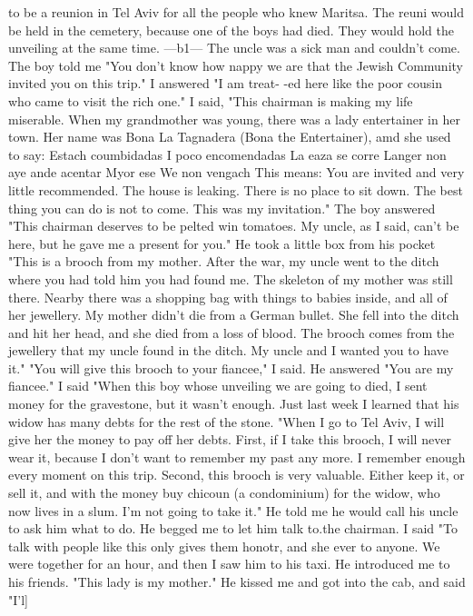 to be a reunion in Tel Aviv for all the people who knew Maritsa.
The reuni 
would be held in the cemetery, because one of the boys had died.
They would 
hold the unveiling at the same time.
—b1— 
The uncle was a sick man and couldn't come.
The boy told me "You don't know how 
nappy we are that the Jewish Community invited you on this trip."
I answered "I am treat-
-ed here like the poor cousin who came to visit the rich one."
I said, "This chairman is 
making my life miserable.
When my grandmother was young, there was a lady entertainer in 
her town.
Her name was Bona La Tagnadera (Bona the Entertainer), amd she used to say: 
Estach coumbidadas 
I poco encomendadas 
La eaza se corre 
Langer non aye ande acentar 
Myor ese We non vengach 
This means: You are invited and very little recommended.
The house is leaking.
There 
is no place to sit down.
The best thing you can do is not to come.
This was my invitation."
The boy answered "This chairman deserves to be pelted win tomatoes.
My uncle, as I 
said, can't be here, but he gave me a present for you."
He took a little box from his pocket 
"This is a brooch from my mother.
After the war, my uncle went to the ditch where you had 
told him you had found me.
The skeleton of my mother was still there.
Nearby there was 
a shopping bag with things to babies inside, and all of her jewellery.
My mother 
didn't die from a German bullet.
She fell into the ditch and hit her head, and she died from a loss of blood.
The brooch comes from the jewellery that my uncle found in the ditch.
My uncle and I wanted you to have it."
"You will give this brooch to your fiancee," I said.
He answered "You are my fiancee."
I said "When this boy whose unveiling we are going to died, I sent money for the gravestone, but it wasn't enough.
Just last week I learned that his widow has many debts for the rest of the stone.
"When I go to Tel Aviv, I will give her the money to pay off her debts.
First, if I take this brooch, I will never wear it, because I don't want to remember my 
past any more.
I remember enough every moment on this trip.
Second, this brooch is very 
valuable.
Either keep it, or sell it, and with the money buy chicoun (a condominium) for 
the widow, who now lives in a slum.
I'm not going to take it."
He told me he would call his uncle to ask him what to do.
He begged me to let him talk 
to.the chairman.
I said "To talk with people like this only gives them honotr, and she 
ever to anyone.
We were together for an hour, and then I saw him to his taxi.
He introduced me to 
his friends.
"This lady is my mother."
He kissed me and got into the cab, and said "I'l] 
